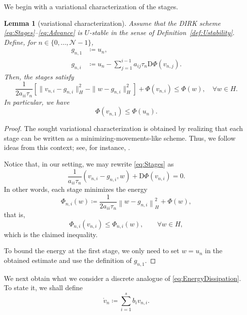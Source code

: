 \documentclass{amsart}
\newcommand{\mclN}{\mathcal{N}}
\newtheorem{lemma}{Lemma}[section]
\theoremstyle{definition}
\newcommand{\Diff}{\mathrm{D}}
\begin{document}
We begin with a variational characterization of the stages.

\begin{lemma}[variational characterization]
\label{lem:VarStages}
  Assume that the DIRK scheme \eqref{eq:Stages}--\eqref{eq:Advance} is $U$-stable in the sense of Definition~\ref{def:Ustability}. Define, for $n \in \{0, \ldots, \mclN-1\}$,
  \begin{align*}
    g_{n,1} &\coloneqq u_n, 
    \\
    g_{n,i} &\coloneqq u_n - \sum_{j=1}^{i-1} a_{ij}\tau_n \Diff\Phi(v_{n,j}).
  \end{align*}
  Then, the stages satisfy
  \[
    \frac1{2a_{ii}\tau_n} \left[ \| v_{n,i} - g_{n,i} \|_H^2 - \| w - g_{n,i} \|_H^2 \right] + \Phi(v_{n,i}) \leq \Phi(w), \quad \forall w \in H.
  \]
  In particular, we have
  \[
    \Phi(v_{n,1}) \leq \Phi(u_n).
  \]
\end{lemma}
\begin{proof}
  The sought variational characterization is obtained by realizing that each stage can be written as a minimizing-movements-like scheme. Thus, we follow ideas from this context; see, for instance, \cite[Lecture 12]{MR4886890}.
  
  Notice that, in our setting, we may rewrite \eqref{eq:Stages} as
  \[
    \frac1{a_{ii}\tau_n} \left( v_{n,i} - g_{n,i}, w \right) + \Diff \Phi(v_{n,i}) = 0.
  \]
  In other words, each stage minimizes the energy
  \[
    \Phi_{n,i}(w) \coloneqq \frac1{2a_{ii}\tau_n} \left\| w - g_{n,i} \right\|_H^2 + \Phi(w),
  \]
  that is,
  \[
    \Phi_{n,i}(v_{n,i}) \leq \Phi_{n,i}(w), \qquad \forall w\in H,
  \]
  which is the claimed inequality.
  
  To bound the energy at the first stage, we only need to set $w=u_n$ in the obtained estimate and use the definition of $g_{n,1}$.
\end{proof}

We next obtain what we consider a discrete analogue of \eqref{eq:EnergyDissipation}. To state it, we shall define
\begin{equation}
\label{eq:defOfLocalMathringV}
  \mathring{v}_n \coloneqq \sum_{i=1}^s b_i v_{n,i}.
\end{equation}
\end{document}
